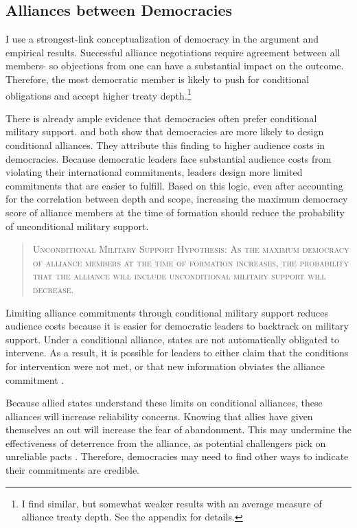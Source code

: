 \documentclass[12pt]{article}
\begin{document}
\subsection{Alliances between Democracies}


I use a strongest-link conceptualization of democracy in the argument and empirical results. 
Successful alliance negotiations require agreement between all members- so objections from one can have a substantial impact on the outcome.  
Therefore, the most democratic member is likely to push for conditional obligations and accept higher treaty depth.\footnote{I find similar, but somewhat weaker results with an average measure of alliance treaty depth. See the appendix for details.}


There is already ample evidence that democracies often prefer conditional military support. 
\citet{Mattes2012} and \citet{Chibaetal2015} both show that democracies are more likely to design conditional alliances. 
They attribute this finding to higher audience costs in democracies. 
Because democratic leaders face substantial audience costs from violating their international commitments, leaders design more limited commitments that are easier to fulfill. 
Based on this logic, even after accounting for the correlation between depth and scope, increasing the maximum democracy score of alliance members at the time of formation should reduce the probability of unconditional military support.


\begin{quote}
\textsc{Unconditional Military Support Hypothesis: As the maximum democracy of alliance members at the time of formation increases, the probability that the alliance will include unconditional military support will decrease.}
\end{quote} 


Limiting alliance commitments through conditional military support reduces audience costs because it is easier for democratic leaders to backtrack on military support. 
Under a conditional alliance, states are not automatically obligated to intervene. 
As a result, it is possible for leaders to either claim that the conditions for intervention were not met, or that new information obviates the alliance commitment \citep{LevenduskyHorowitz2012}. 


Because allied states understand these limits on conditional alliances, these alliances will increase reliability concerns. 
Knowing that allies have given themselves an out will increase the fear of abandonment. 
This may undermine the effectiveness of deterrence from the alliance, as potential challengers pick on unreliable pacts \citep{Smith1995}. 
Therefore, democracies may need to find other ways to indicate their commitments are credible. 
\end{document}
